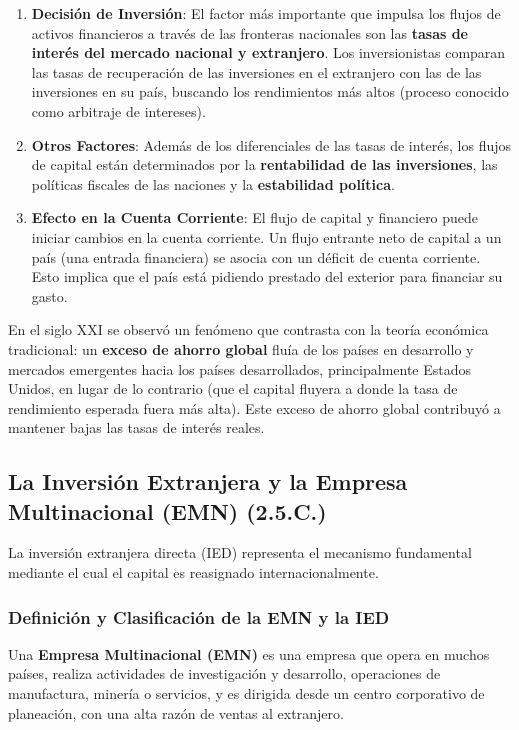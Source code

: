 \begin{enumerate}
    \item \textbf{Decisión de Inversión}: El factor más importante que impulsa los flujos de activos financieros a través de las fronteras nacionales son las \textbf{tasas de interés del mercado nacional y extranjero}. Los inversionistas comparan las tasas de recuperación de las inversiones en el extranjero con las de las inversiones en su país, buscando los rendimientos más altos (proceso conocido como arbitraje de intereses).
    \item \textbf{Otros Factores}: Además de los diferenciales de las tasas de interés, los flujos de capital están determinados por la \textbf{rentabilidad de las inversiones}, las políticas fiscales de las naciones y la \textbf{estabilidad política}.
    \item \textbf{Efecto en la Cuenta Corriente}: El flujo de capital y financiero puede iniciar cambios en la cuenta corriente. Un flujo entrante neto de capital a un país (una entrada financiera) se asocia con un déficit de cuenta corriente. Esto implica que el país está pidiendo prestado del exterior para financiar su gasto.
\end{enumerate}

\begin{nota}
En el siglo XXI se observó un fenómeno que contrasta con la teoría económica tradicional: un \textbf{exceso de ahorro global} fluía de los países en desarrollo y mercados emergentes hacia los países desarrollados, principalmente Estados Unidos, en lugar de lo contrario (que el capital fluyera a donde la tasa de rendimiento esperada fuera más alta). Este exceso de ahorro global contribuyó a mantener bajas las tasas de interés reales.
\end{nota}

\subsection{La Inversión Extranjera y la Empresa Multinacional (EMN) (2.5.C.)}

La inversión extranjera directa (IED) representa el mecanismo fundamental mediante el cual el capital es reasignado internacionalmente.

\subsubsection{Definición y Clasificación de la EMN y la IED}

\begin{definicion}
Una \textbf{Empresa Multinacional (EMN)} es una empresa que opera en muchos países, realiza actividades de investigación y desarrollo, operaciones de manufactura, minería o servicios, y es dirigida desde un centro corporativo de planeación, con una alta razón de ventas al extranjero.
\end{definicion}


